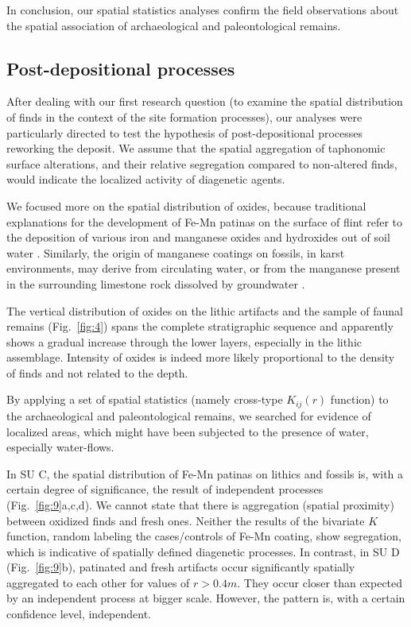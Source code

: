 \documentclass[review,authoryear]{elsarticle} %
\begin{document}
In conclusion, our spatial statistics analyses confirm the field observations about the spatial association of archaeological and paleontological remains.

\subsection{Post-depositional processes}

After dealing with our first research question (to examine the spatial distribution of finds in the context of the site formation processes), our analyses were particularly directed to test the hypothesis of post-depositional processes reworking the deposit. We assume that the spatial aggregation of taphonomic surface alterations, and their relative segregation compared to non-altered finds, would indicate the localized activity of diagenetic agents.

We focused more on the spatial distribution of oxides, because traditional explanations for the development of Fe-Mn patinas on the surface of flint refer to the deposition of various iron and manganese oxides and hydroxides out of soil water \citep{Stapert1976}. Similarly, the origin of manganese coatings on fossils, in karst environments, may derive from circulating water, or from the manganese present in the surrounding limestone rock dissolved by groundwater \citep{Hill1982}.

The vertical distribution of oxides on the lithic artifacts and the sample of faunal remains (Fig.~\ref{fig:4}) spans the complete stratigraphic sequence and apparently shows a gradual increase through the lower layers, especially in the lithic assemblage. Intensity of oxides is indeed more likely proportional to the density of finds and not related to the depth.

By applying a set of spatial statistics (namely cross-type $K_{ij}(r)$ function) to the archaeological and paleontological remains, we searched for evidence of localized areas, which might have been subjected to the presence of water, especially water-flows.

In SU C, the spatial distribution of Fe-Mn patinas on lithics and fossils is, with a certain degree of significance, the result of independent processes (Fig.~\ref{fig:9}a,c,d). We cannot state that there is aggregation (spatial proximity) between oxidized finds and fresh ones. Neither the results of the bivariate $K$ function, random labeling the cases/controls of Fe-Mn coating, show segregation, which is indicative of spatially defined diagenetic processes. In contrast, in SU D (Fig.~\ref{fig:9}b), patinated and fresh artifacts occur significantly spatially aggregated to each other for values of $r>0.4 m$. They occur closer than expected by an independent process at bigger scale. However, the pattern is, with a certain confidence level, independent.
\end{document}
